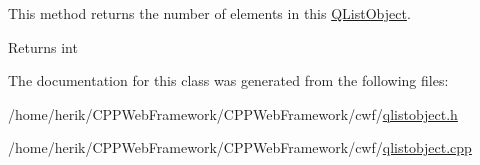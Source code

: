 This method returns the number of elements in this \hyperlink{class_c_w_f_1_1_q_list_object}{Q\+List\+Object}. 

\begin{DoxyReturn}{Returns}
int 
\end{DoxyReturn}


The documentation for this class was generated from the following files\+:\begin{DoxyCompactItemize}
\item 
/home/herik/\+C\+P\+P\+Web\+Framework/\+C\+P\+P\+Web\+Framework/cwf/\hyperlink{qlistobject_8h}{qlistobject.\+h}\item 
/home/herik/\+C\+P\+P\+Web\+Framework/\+C\+P\+P\+Web\+Framework/cwf/\hyperlink{qlistobject_8cpp}{qlistobject.\+cpp}\end{DoxyCompactItemize}
